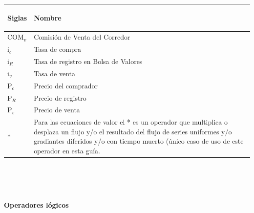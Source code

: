 \begin{spacing}{1}
\begin{center}
\begin{tabular}{ |p{2.5cm}|p{9.5cm}|}
\hline 
\rowcolor{orange!50}
\begin{center}\textbf{Siglas} \end{center} & \begin{center} \textbf{Nombre} \end{center} \\ \hline     
 

COM$_{v}$ & Comisión de Venta del Corredor\\ \hline 
i$_{c}$ & Tasa de compra\\ \hline 
i$_{R}$ & Tasa de registro en Bolsa de Valores\\ \hline
i$_{v}$ & Tasa de venta\\ \hline  
P$_{c}$ & Precio del comprador\\ \hline  
P$_{R}$ & Precio de registro\\ \hline  
P$_{v}$ & Precio de venta\\ \hline  
$*$ & Para las ecuaciones de valor el * es un operador que multiplica o desplaza un flujo y/o el resultado del flujo de series uniformes y/o gradiantes diferidos y/o con tiempo muerto (único caso de uso de este operador en esta guía.\\ \hline
 

 
\end{tabular}
\end{center}
\end{spacing}

\\ \\ \\

\begin{center} \textbf {Operadores lógicos}\\ \end{center} 

